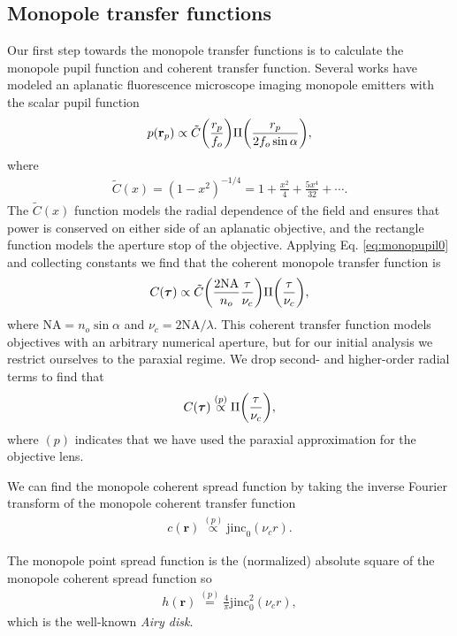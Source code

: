\documentclass[]{osa-article}
\let\originalleft\left
\let\originalright\right
\renewcommand{\left}{\mathopen{}\mathclose\bgroup\originalleft}
\renewcommand{\right}{\aftergroup\egroup\originalright}
\providecommand{\mb}[1]{\mathbf{#1}}
\providecommand{\rp}{\mathbf{r}_p}
\providecommand{\bs}[1]{\boldsymbol{#1}}
\providecommand{\taup}{\bs{\tau}}
\begin{document}
\subsection{Monopole transfer functions}
Our first step towards the monopole transfer functions is to calculate the
monopole pupil function and coherent transfer function. Several works
\cite{petrov2017, backlund2018} have modeled an aplanatic fluorescence
microscope imaging monopole emitters with the scalar pupil function
\begin{align}
  p(\rp) \propto \tilde{C}\left(\frac{r_p}{f_o}\right)\Pi\left(\frac{r_p}{2f_o\sin\alpha}\right), 
\end{align}
where
\begin{align}
  \tilde{C}(x) = (1 - x^2)^{-1/4} = 1 + \frac{x^2}{4} + \frac{5x^4}{32} + \cdots. 
\end{align}
The $\tilde{C}(x)$ function models the radial dependence of the field and
ensures that power is conserved on either side of an aplanatic objective, and
the rectangle function models the aperture stop of the objective. Applying Eq.
\eqref{eq:monopupil0} and collecting constants we find that the coherent monopole
transfer function is
\begin{align}
  C(\taup) \propto \tilde{C}\left(\frac{2\text{NA}}{n_o}\frac{\tau}{\nu_c}\right)\Pi\left(\frac{\tau}{\nu_c}\right), \label{eq:coherentmonopole}
\end{align}
where $\text{NA} = n_o\sin\alpha$ and $\nu_c = 2\text{NA}/\lambda$. This
coherent transfer function models objectives with an arbitrary numerical
aperture, but for our initial analysis we restrict ourselves to the paraxial
regime. We drop second- and higher-order radial terms to find that
\begin{align}
  C(\taup) \stackrel{(p)}{\propto} \Pi\left(\frac{\tau}{\nu_c}\right), 
\end{align}
where $(p)$ indicates that we have used the paraxial approximation for the
objective lens.

We can find the monopole coherent spread function by taking the inverse Fourier
transform of the monopole coherent transfer function
\begin{align}
  c(\mb{r}) \stackrel{(p)}{\propto} \text{jinc}_0(\nu_c r).
\end{align}

The monopole point spread function is the (normalized) absolute square of the
monopole coherent spread function so
\begin{align}
  h(\mb{r}) \stackrel{(p)}{=} \frac{4}{\pi}\text{jinc}_0^2(\nu_c r),
\end{align}
which is the well-known \textit{Airy disk}.
\end{document}
